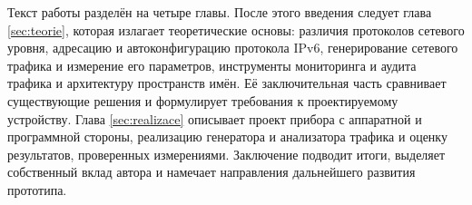 Текст работы разделён на четыре главы. После этого введения следует глава \ref{sec:teorie}, которая излагает теоретические основы: различия протоколов сетевого уровня, адресацию и автоконфигурацию протокола IPv6, генерирование сетевого трафика и измерение его параметров, инструменты мониторинга и аудита трафика и архитектуру пространств имён. Её заключительная часть сравнивает существующие решения и формулирует требования к проектируемому устройству. Глава \ref{sec:realizace} описывает проект прибора с аппаратной и программной стороны, реализацию генератора и анализатора трафика и оценку результатов, проверенных измерениями. Заключение подводит итоги, выделяет собственный вклад автора и намечает направления дальнейшего развития прототипа.
